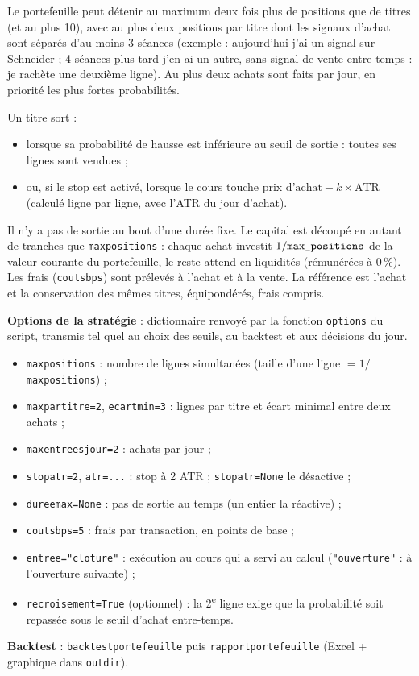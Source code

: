 \documentclass[11pt,a4paper]{article}
\renewcommand{\_}{\usorig\allowbreak}   %
\newcommand{\f}[1]{\texttt{#1}}        %
\begin{document}
Le portefeuille peut détenir au maximum deux fois plus de positions que de titres (et au
plus 10), avec au plus deux positions par titre dont les signaux d'achat sont séparés
d'au moins 3 séances (exemple : aujourd'hui j'ai un signal sur Schneider ; 4 séances plus
tard j'en ai un autre, sans signal de vente entre-temps : je rachète une deuxième ligne).
Au plus deux achats sont faits par jour, en priorité les plus fortes probabilités.

Un titre sort :
\begin{itemize}[nosep]
  \item lorsque sa probabilité de hausse est inférieure au seuil de sortie : toutes ses
  lignes sont vendues ;
  \item ou, si le stop est activé, lorsque le cours touche $\text{prix d'achat} - k\times\text{ATR}$
  (calculé ligne par ligne, avec l'ATR du jour d'achat).
\end{itemize}
Il n'y a pas de sortie au bout d'une durée fixe. Le capital est découpé en autant de
tranches que \f{max\_positions} : chaque achat investit $1/\f{max\_positions}$ de la valeur
courante du portefeuille, le reste attend en liquidités (rémunérées à 0\,\%). Les frais
(\f{couts\_bps}) sont prélevés à l'achat et à la vente. La référence est l'achat et la
conservation des mêmes titres, équipondérés, frais compris.

\begin{danslecode}
\textbf{Options de la stratégie} : dictionnaire renvoyé par la fonction \f{options} du
script, transmis tel quel au choix des seuils, au backtest et aux décisions du jour.
\begin{itemize}[nosep]
  \item \f{max\_positions} : nombre de lignes simultanées (taille d'une ligne $=1/$\f{max\_positions}) ;
  \item \f{max\_par\_titre=2}, \f{ecart\_min=3} : lignes par titre et écart minimal entre deux achats ;
  \item \f{max\_entrees\_jour=2} : achats par jour ;
  \item \f{stop\_atr=2}, \f{atr=...} : stop à 2 ATR ; \f{stop\_atr=None} le désactive ;
  \item \f{duree\_max=None} : pas de sortie au temps (un entier la réactive) ;
  \item \f{couts\_bps=5} : frais par transaction, en points de base ;
  \item \f{entree="cloture"} : exécution au cours qui a servi au calcul (\f{"ouverture"} :
  à l'ouverture suivante) ;
  \item \f{recroisement=True} (optionnel) : la 2\textsuperscript{e} ligne exige que la
  probabilité soit repassée sous le seuil d'achat entre-temps.
\end{itemize}
\textbf{Backtest} : \f{backtest\_portefeuille} puis \f{rapport\_portefeuille}
(Excel + graphique dans \f{out\_dir}).
\end{danslecode}
\end{document}
